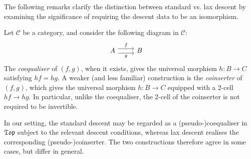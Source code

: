 \documentclass[a4paper, 11pt,reqno]{amsart}
\begin{document}
The following remarks clarify the distinction between standard vs. lax descent by examining the significance of requiring the descent data to be an isomorphism. 

\begin{remark}\label{rem:coinsert} Let $\mathcal{C}$ be a category, and consider the following diagram in $\mathcal{C}$:
	\begin{equation}\label{eq:COEQvsCOINSERT}
	\begin{tikzcd}
	A  \ar[r,shift left=.75ex,"f"]\ar[r,shift right=.75ex,swap,"g"] & B
	\end{tikzcd} 
	\end{equation}
The \textit{coequaliser} of $(f,g)$, when it exists, gives the universal morphism $h\colon B\rightarrow C$ satisfying $hf=hg$. A weaker (and less familiar) construction is the \emph{coinserter} of $(f,g)$, which gives the universal morphism $h\colon B\rightarrow C$ equipped with a 2-cell $hf\rightarrow hg$. In particular, unlike the coequaliser, the 2-cell of the coinserter is not required to be invertible.
	
In our setting, the standard descent may be regarded as a (pseudo-)coequaliser in $\mathfrak{Top}$ subject to the relevant descent conditions, whereas lax descent realises the corresponding (pseudo-)coinserter. The two constructions therefore agree in some cases, but differ in general.
\end{remark}
\end{document}
